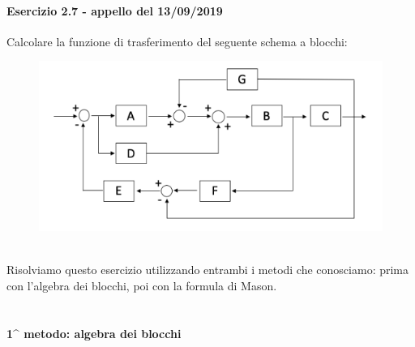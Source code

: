 \documentclass[12pt,a4paper]{article}
\begin{document}
	\paragraph*{Esercizio 2.7 - appello del 13/09/2019} Calcolare la funzione di trasferimento del seguente schema a blocchi:
	\begin{figure}[h!]
		\centering
		\includegraphics[scale=0.5]{./images/schema27.png}
	\end{figure}
	\\ Risolviamo questo esercizio utilizzando entrambi i metodi che conosciamo: prima con l'algebra dei blocchi, poi con la formula di Mason.\\ \\ \\
	\textbf{1^ metodo: algebra dei blocchi}
\end{document}
